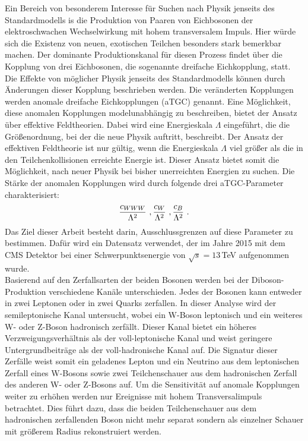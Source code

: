Ein Bereich von besonderem Interesse für Suchen nach Physik jenseits des Standardmodells is die Produktion von Paaren von Eichbosonen der elektroschwachen Wechselwirkung mit hohem transversalem Impuls. Hier würde sich die Existenz von neuen, exotischen Teilchen besonders stark bemerkbar machen. Der dominante Produktionskanal für diesen Prozess findet über die Kopplung von drei Eichbosonen, die sogenannte dreifache Eichkopplung, statt. Die Effekte von möglicher Physik jenseits des Standardmodells können durch Änderungen dieser Kopplung beschrieben werden. Die veränderten Kopplungen werden anomale dreifache Eichkopplungen (aTGC) genannt. Eine Möglichkeit, diese anomalen Kopplungen modelunabhängig zu beschreiben, bietet der Ansatz über effektive Feldtheorien. Dabei wird eine Energieskala $\Lambda$ eingeführt, die die Größenordnung, bei der die neue Physik auftritt, beschreibt. Der Ansatz der effektiven Feldtheorie ist nur gültig, wenn die Energieskala $\Lambda$ viel größer als die in den Teilchenkollisionen erreichte Energie ist. Dieser Ansatz bietet somit die Möglichkeit, nach neuer Physik bei bisher unerreichten Energien zu suchen. Die Stärke der anomalen Kopplungen wird durch folgende drei aTGC-Parameter charakterisiert:
\begin{equation*}
\frac{c_{WWW}}{\Lambda^2} \ , \frac{c_{W}}{\Lambda^2} \ , \frac{c_{B}}{\Lambda^2} \ .
\end{equation*}
 Das Ziel dieser Arbeit besteht darin, Ausschlussgrenzen auf diese Parameter zu bestimmen. Dafür wird ein Datensatz verwendet, der im Jahre 2015 mit dem CMS Detektor bei einer Schwerpunktsenergie von $\sqrt{s}=13$\,TeV aufgenommen wurde.\\



Basierend auf den Zerfallsarten der beiden Bosonen werden bei der Diboson-Produktion verschiedene Kanäle unterschieden. Jedes der Bosonen kann entweder in zwei Leptonen oder in zwei Quarks zerfallen. In dieser Analyse wird der semileptonische Kanal untersucht, wobei ein W-Boson leptonisch und ein weiteres W- oder Z-Boson hadronisch zerfällt. Dieser Kanal bietet ein höheres Verzweigungsverhältnis als der voll-leptonische Kanal und weist geringere Untergrundbeiträge als der voll-hadronische Kanal auf. Die Signatur dieser Zerfälle weist somit ein geladenes Lepton und ein Neutrino aus dem leptonischen Zerfall eines W-Bosons sowie zwei Teilchenschauer aus dem hadronischen Zerfall des anderen W- oder Z-Bosons auf. Um die Sensitivität auf anomale Kopplungen weiter zu erhöhen werden nur Ereignisse mit hohem Transversalimpuls betrachtet. Dies führt dazu, dass die beiden Teilchenschauer aus dem hadronischen zerfallenden Boson nicht mehr separat sondern als einzelner Schauer mit größerem Radius rekonstruiert werden.\\

